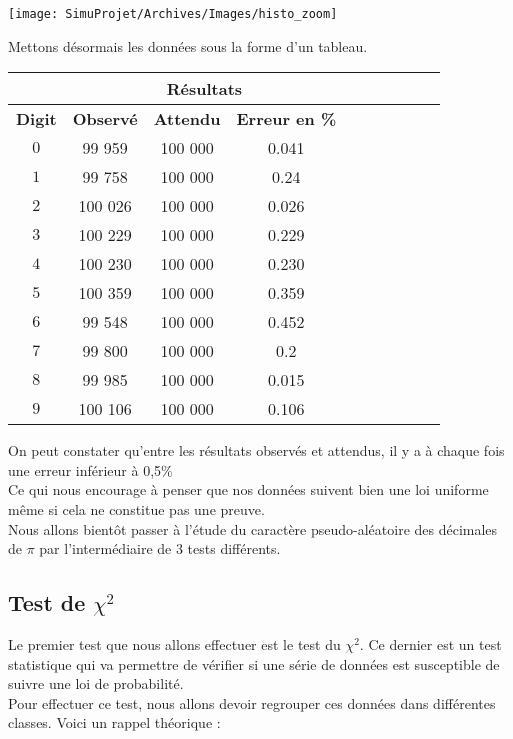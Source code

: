 \documentclass[french]{article}
\begin{document}
\begin{center}
	\texttt{[image: SimuProjet/Archives/Images/histo\_zoom]}
\end{center}

Mettons désormais les données sous la forme d'un tableau.

\begin{longtable}{|c|c|c|c|c|c|c|c|c|c|}
	\hline
	& \multicolumn{3}{c|}{\textbf{Résultats}} \\ 
	\hline 
	\textbf{Digit}  & \textbf{Observé} & \textbf{Attendu} & \textbf{Erreur en \%} \\ 
	\hline 
	$$0$$ & 99 959 & 100 000 & 0.041\\ 
	\hline 
	$$1$$ & 99 758 & 100 000 & 0.24\\ 
	\hline 
	$$2$$ & 100 026 & 100 000 & 0.026 \\ 
	\hline 
	$$3$$ & 100 229 & 100 000 & 0.229\\ 
	\hline 
	$$4$$ & 100 230 & 100 000 & 0.230\\ 
	\hline 
	$$5$$ & 100 359 & 100 000 & 0.359\\ 
	\hline 
	$$6$$ & 99 548 & 100 000 & 0.452\\ 
	\hline 
	$$7$$ & 99 800 & 100 000 & 0.2\\ 
	\hline 
	$$8$$ & 99 985 & 100 000 & 0.015\\ 
	\hline 
	$$9$$ & 100 106 & 100 000 & 0.106\\ 
	\hline
\end{longtable}

On peut constater qu'entre les résultats observés et attendus, il y a à chaque fois une
erreur inférieur à 0,5\%
\\
Ce qui nous encourage à penser que nos données suivent bien une loi uniforme même si cela ne 
constitue pas une preuve.
\\
Nous allons bientôt passer à l'étude du caractère pseudo-aléatoire des décimales de $\pi$
par l'intermédiaire de 3 tests différents.
\\
\subsection{Test de $\chi^{2}$ }
Le premier test que nous allons effectuer est le test du \textbf{$\chi^{2}$}. Ce dernier est un test statistique qui va permettre de vérifier si une série de données est susceptible de suivre une loi de probabilité.
\\
Pour effectuer ce test, nous allons devoir regrouper ces données dans différentes classes.
Voici un rappel théorique :
\end{document}
